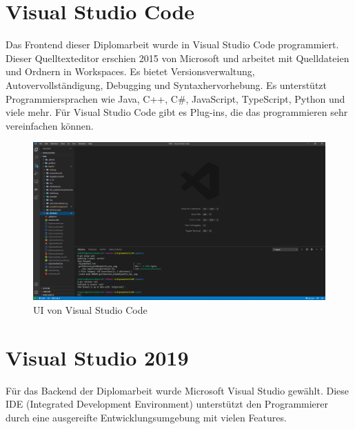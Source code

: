\section{Visual Studio Code}
Das Frontend dieser Diplomarbeit wurde in Visual Studio Code programmiert. Dieser Quelltexteditor erschien 2015 von Microsoft und arbeitet mit Quelldateien und Ordnern in Workspaces. Es bietet Versionsverwaltung, Autovervollständigung, Debugging und Syntaxhervorhebung. Es unterstützt Programmiersprachen wie Java, C++, C\#, JavaScript, TypeScript, Python und viele mehr. Für Visual Studio Code gibt es Plug-ins, die das programmieren sehr vereinfachen können. \autocite{wikiVisualStudioCode}

\begin{figure}[H]
	\centerline{
		\includegraphics[width=1\textwidth, frame]{./grafiken/vs_code_startbildschirm.PNG}
	}
	\vskip0pt
	\caption{UI von Visual Studio Code} \label{fig:visualStudioCodeStartview}
\end{figure}

\section{Visual Studio 2019}

Für das Backend der Diplomarbeit wurde Microsoft Visual Studio gewählt. Diese IDE (Integrated Development Environment) unterstützt den Programmierer durch eine ausgereifte Entwicklungsumgebung mit vielen Features.\\

